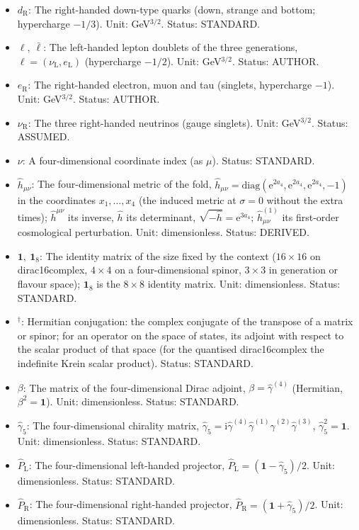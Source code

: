 \documentclass[
  10pt,
]{article}
\begin{document}
\begin{itemize}
  \(u_{\mathrm{R}}\): The right-handed up-type quarks (up, charm and
  top; singlets of \(SU(2)_L\), hypercharge \(2/3\)). Unit:
  GeV\(^{3/2}\). Status: STANDARD.
\item
  \(d_{\mathrm{R}}\): The right-handed down-type quarks (down, strange
  and bottom; hypercharge \(-1/3\)). Unit: GeV\(^{3/2}\). Status:
  STANDARD.
\item
  \(\ell,\ \bar\ell\): The left-handed lepton doublets of the three
  generations, \(\ell = (\nu_{\mathrm{L}}, e_{\mathrm{L}})\)
  (hypercharge \(-1/2\)). Unit: GeV\(^{3/2}\). Status: AUTHOR.
\item
  \(e_{\mathrm{R}}\): The right-handed electron, muon and tau (singlets,
  hypercharge \(-1\)). Unit: GeV\(^{3/2}\). Status: AUTHOR.
\item
  \(\nu_{\mathrm{R}}\): The three right-handed neutrinos (gauge
  singlets). Unit: GeV\(^{3/2}\). Status: ASSUMED.
\item
  \(\nu\): A four-dimensional coordinate index (as \(\mu\)). Status:
  STANDARD.
\item
  \(\hat h_{\mu\nu}\): The four-dimensional metric of the fold,
  \(\hat h_{\mu\nu} = \mathrm{diag}(\mathrm{e}^{2a_4}, \mathrm{e}^{2a_4}, \mathrm{e}^{2a_4}, -1)\)
  in the coordinates \(x_1, \dots, x_4\) (the induced metric at
  \(\sigma = 0\) without the extra times); \(\hat h^{\mu\nu}\) its
  inverse, \(\hat h\) its determinant,
  \(\sqrt{-\hat h} = \mathrm{e}^{3a_4}\); \(\hat h^{(1)}_{\mu\nu}\) its
  first-order cosmological perturbation. Unit: dimensionless. Status:
  DERIVED.
\item
  \(\mathbf{1},\ \mathbf{1}_8\): The identity matrix of the size fixed
  by the context (\(16 \times 16\) on dirac16complex, \(4 \times 4\) on
  a four-dimensional spinor, \(3 \times 3\) in generation or flavour
  space); \(\mathbf{1}_8\) is the \(8 \times 8\) identity matrix. Unit:
  dimensionless. Status: STANDARD.
\item
  \({}^\dagger\): Hermitian conjugation: the complex conjugate of the
  transpose of a matrix or spinor; for an operator on the space of
  states, its adjoint with respect to the scalar product of that space
  (for the quantised dirac16complex the indefinite Krein scalar
  product). Status: STANDARD.
\item
  \(\beta\): The matrix of the four-dimensional Dirac adjoint,
  \(\beta = \hat\gamma^{(4)}\) (Hermitian, \(\beta^2 = \mathbf{1}\)).
  Unit: dimensionless. Status: STANDARD.
\item
  \(\hat\gamma_5\): The four-dimensional chirality matrix,
  \(\hat\gamma_5 = \mathrm{i}\hat\gamma^{(4)}\hat\gamma^{(1)}\hat\gamma^{(2)}\hat\gamma^{(3)}\),
  \(\hat\gamma_5^2 = \mathbf{1}\). Unit: dimensionless. Status:
  STANDARD.
\item
  \(\hat P_{\mathrm{L}}\): The four-dimensional left-handed projector,
  \(\hat P_{\mathrm{L}} = (\mathbf{1} - \hat\gamma_5)/2\). Unit:
  dimensionless. Status: STANDARD.
\item
  \(\hat P_{\mathrm{R}}\): The four-dimensional right-handed projector,
  \(\hat P_{\mathrm{R}} = (\mathbf{1} + \hat\gamma_5)/2\). Unit:
  dimensionless. Status: STANDARD.
\end{itemize}
\end{document}
